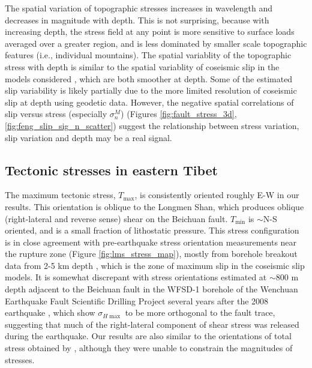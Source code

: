 \documentclass[draft,jgrga]{AGUTeX}
\begin{document}
\begin{article}
The spatial variation of topographic stresses increases in wavelength and
decreases in magnitude with depth. This is not surprising, because with
increasing
depth, the stress field at any point is more sensitive to surface loads
averaged over a greater region, and is less dominated by smaller scale
topographic features (i.e., individual mountains). The spatial
variablity of the topographic stress with depth is similar to the spatial
variablity of coseismic slip in the models considered \citep[e.g.,][]
{zhang2011}, which are both smoother at depth. Some of the
estimated slip variability is likely partially due to the more limited
resolution of coseismic slip at depth using geodetic data.
However, the negative spatial correlations of slip versus stress
(especially $\sigma^M_n$) (Figures \ref{fig:fault_stress_3d},
\ref{fig:feng_slip_sig_n_scatter}) suggest the relationship between
stress variation, slip variation and depth may be a real signal.

\subsection{Tectonic stresses in eastern
Tibet}\label{tectonic-stresses-in-eastern-tibet}

The maximum tectonic stress, $T_{\mathrm{max}}$, is consistently
oriented roughly E-W in our results. This orientation is oblique to the
Longmen Shan, which produces oblique (right-lateral and reverse sense)
shear on the Beichuan fault. $T_{\mathrm{min}}$ is $\sim$N-S
oriented, and is a small fraction of lithostatic pressure. This
stress configuration is in close agreement with pre-earthquake stress
orientation
measurements near the rupture zone (Figure \ref{fig:lms_stress_map}),
mostly from borehole breakout data from 2-5 km depth
\citep{heidbach2009}, which is the zone of maximum slip in the coseismic
slip models. It is somewhat discrepant with stress orientations
estimated at $\sim$800 m depth adjacent to the Beichuan fault
in the WFSD-1 borehole of the Wenchuan Earthquake Fault Scientific
Drilling Project several years after the 2008 earthquake \citep{cui2014},
which show $\sigma_{H{\mathrm{\max}}}$ to be more orthogonal to the fault
trace, suggesting that much of the right-lateral component of shear
stress was released during the earthquake. Our results are also similar to
the orientations of total stress obtained by 
\citet{medinaluna2013}, although they were unable to constrain the
magnitudes of stresses.


\end{article}
\end{document}
